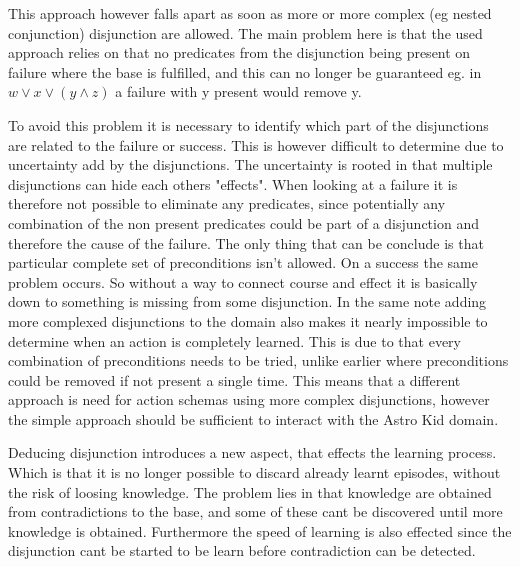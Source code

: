 	This approach however falls apart as soon as more or more complex (eg nested conjunction) disjunction are allowed. The main problem here is that the used approach relies on that no predicates from the disjunction being present on failure where the base is fulfilled, and this can no longer be guaranteed eg. in $w \lor x \lor (y \land z )$ a failure with y present would remove y. 
	
	To avoid this problem it is necessary to identify which part of the disjunctions are related to the failure or success. This is however difficult to determine due to uncertainty add by the disjunctions. The uncertainty is rooted in that multiple disjunctions can hide each others "effects". When looking at a failure it is therefore not possible to eliminate any predicates, since potentially any combination of the non present predicates could be part of a disjunction and therefore the cause of the failure. The only thing that can be conclude is that particular complete set of preconditions isn't allowed. On a success the same problem occurs. So without a way to connect course and effect it is basically down to something is missing from some disjunction. In the same note adding more complexed disjunctions to the domain also makes it nearly impossible to determine when an action is completely learned. This is due to that every combination of preconditions needs to be tried, unlike earlier where preconditions could be removed if not present a single time. This means that a different approach is need for action schemas using more complex disjunctions, however the simple approach should be sufficient to interact with the Astro Kid domain.
	 
	

%	
	


	Deducing disjunction introduces a new aspect, that effects the learning process.  Which is that it is no longer possible to discard already learnt episodes,  without the risk of loosing knowledge. The problem lies in that knowledge are obtained from contradictions to the base, and some of these cant be discovered until more knowledge is obtained. Furthermore the speed of learning is also effected since the disjunction cant be started to be learn before contradiction can be detected. 
	
	
